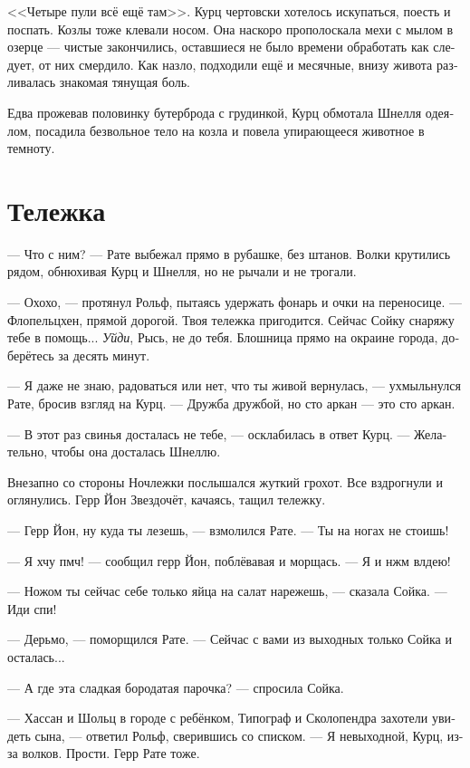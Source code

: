 \documentclass[a4paper,12pt,fleqn]{book}\usepackage{polyglossia}\setdefaultlanguage[babelshorthands=true]{russian}\setotherlanguage{english}\defaultfontfeatures{Ligatures=TeX,Mapping=tex-text}\usepackage{xcolor}\newcommand{\ml}[3]{#2}
\begin{document}
\ml{$0$}
{<<Четыре пули всё ещё там>>.}
{\textit{Four bullets are still inside.}}
Курц чертовски хотелось искупаться, поесть и поспать.
Козлы тоже клевали носом.
Она наскоро прополоскала мехи с мылом в озерце --- чистые закончились, оставшиеся не было времени обработать как следует, от них смердило.
Как назло, подходили ещё и месячные, внизу живота разливалась знакомая тянущая боль.

Едва прожевав половинку бутерброда с грудинкой, Курц обмотала Шнелля одеялом, посадила безвольное тело на козла и повела упирающееся животное в темноту.

\section{Тележка}

--- Что с ним? --- Рате выбежал прямо в рубашке, без штанов.
Волки крутились рядом, обнюхивая Курц и Шнелля, но не рычали и не трогали.

--- Охохо, --- протянул Рольф, пытаясь удержать фонарь и очки на переносице.
\ml{$0$}
{--- Флопельцхен, прямой дорогой.}
{``Flohpelzchen, right that way.}
Твоя тележка пригодится.
Сейчас Сойку снаряжу тебе в помощь...
\textit{Уйди}, Рысь, не до тебя.
Блошница прямо на окраине города, доберётесь за десять минут.

--- Я даже не знаю, радоваться или нет, что ты живой вернулась, --- ухмыльнулся Рате, бросив взгляд на Курц.
--- Дружба дружбой, но сто аркан --- это сто аркан.

--- В этот раз свинья досталась не тебе, --- осклабилась в ответ Курц.
--- Желательно, чтобы она досталась Шнеллю.

Внезапно со стороны Ночлежки послышался жуткий грохот.
Все вздрогнули и оглянулись.
Герр Йон Звездочёт, качаясь, тащил тележку.

--- Герр Йон, ну куда ты лезешь, --- взмолился Рате.
--- Ты на ногах не стоишь!

--- Я хчу пмч! --- сообщил герр Йон, поблёвавая и морщась.
--- Я и нжм влдею!

--- Ножом ты сейчас себе только яйца на салат нарежешь, --- сказала Сойка.
--- Иди спи!

--- Дерьмо, --- поморщился Рате.
--- Сейчас с вами из выходных только Сойка и осталась...

--- А где эта сладкая бородатая парочка? --- спросила Сойка.

--- Хассан и Шольц в городе с ребёнком, Типограф и Сколопендра захотели увидеть сына, --- ответил Рольф, сверившись со списком.
--- Я невыходной, Курц, из-за волков.
Прости.
Герр Рате тоже.
\end{document}
